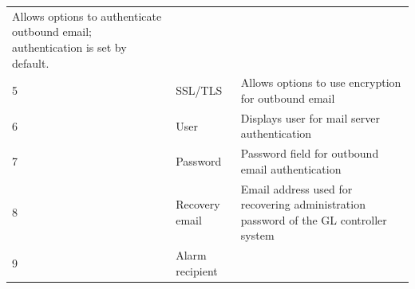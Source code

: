 \begin{longtable}[]{@{}lll@{}}
\begin{minipage}[t]{0.65\columnwidth}
Allows options to authenticate outbound email; authentication is set by
default.\strut
\end{minipage}\tabularnewline
\begin{minipage}[t]{0.04\columnwidth}\raggedright
5\strut
\end{minipage} & \begin{minipage}[t]{0.23\columnwidth}\raggedright
SSL/TLS\strut
\end{minipage} & \begin{minipage}[t]{0.65\columnwidth}\raggedright
Allows options to use encryption for outbound email\strut
\end{minipage}\tabularnewline
\begin{minipage}[t]{0.04\columnwidth}\raggedright
6\strut
\end{minipage} & \begin{minipage}[t]{0.23\columnwidth}\raggedright
User\strut
\end{minipage} & \begin{minipage}[t]{0.65\columnwidth}\raggedright
Displays user for mail server authentication\strut
\end{minipage}\tabularnewline
\begin{minipage}[t]{0.04\columnwidth}\raggedright
7\strut
\end{minipage} & \begin{minipage}[t]{0.23\columnwidth}\raggedright
Password\strut
\end{minipage} & \begin{minipage}[t]{0.65\columnwidth}\raggedright
Password field for outbound email authentication\strut
\end{minipage}\tabularnewline
\begin{minipage}[t]{0.04\columnwidth}\raggedright
8\strut
\end{minipage} & \begin{minipage}[t]{0.23\columnwidth}\raggedright
Recovery email\strut
\end{minipage} & \begin{minipage}[t]{0.65\columnwidth}\raggedright
Email address used for recovering administration password of the GL
controller system\strut
\end{minipage}\tabularnewline
\begin{minipage}[t]{0.04\columnwidth}\raggedright
9\strut
\end{minipage} & \begin{minipage}[t]{0.23\columnwidth}\raggedright
Alarm recipient\strut
\end{minipage} & \begin{minipage}[t]{0.65\columnwidth}\raggedright

\end{minipage}
\end{longtable}
